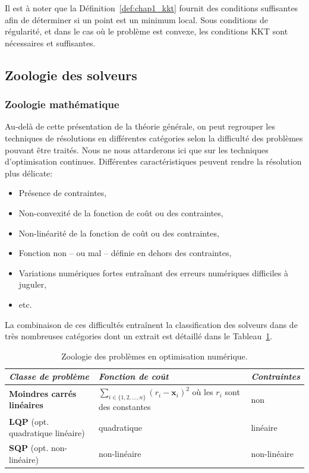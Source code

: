 Il est à noter que la Définition~\ref{def:chap1_kkt} fournit des
conditions suffisantes afin de déterminer si un point est un minimum
local. Sous conditions de régularité, et dans le cas où le problème
est convexe, les conditions KKT sont nécessaires et suffisantes.


\subsection{Zoologie des solveurs}

\subsubsection{Zoologie mathématique}


Au-delà de cette présentation de la théorie générale, on peut
regrouper les techniques de résolutions en différentes catégories
selon la difficulté des problèmes pouvant être traités. Nous ne nous
attarderons ici que sur les techniques d'optimisation
continues. Différentes caractéristiques peuvent rendre la résolution
plus délicate:
%
\begin{itemize}
\item Présence de contraintes,
\item Non-convexité de la fonction de coût ou des contraintes,
\item Non-linéarité de la fonction de coût ou des contraintes,
\item Fonction non -- ou mal -- définie en dehors des contraintes,
\item Variations numériques fortes entraînant des erreurs numériques
  difficiles à juguler,
\item etc.
\end{itemize}
%
La combinaison de ces difficultés entraînent la classification des
solveurs dans de très nombreuses catégories dont un extrait est
détaillé dans le Tableau~\ref{tbl:chap1_solver}.
%
\begin{table}\label{tbl:chap1_solver}
\begin{center}
\begin{tabular}{|>{\small}p{}|>{\small}p{}|>{\small}p{}|}
\hline
\textit{Classe de problème} & \textit{Fonction de coût} & \textit{Contraintes}\\
\hline
\textbf{Moindres carrés linéaires} & $\sum_{i \in \{1, 2, \dotsc, n\}} (r_i - \mathbf{x}_i)^2$ où les $r_i$ sont des constantes & non \\
\hline
\textbf{LQP} \small{(opt. quadratique linéaire)} & quadratique & linéaire \\
\hline
\textbf{SQP} \small{(opt. non-linéaire)} & non-linéaire & non-linéaire \\
\hline
\end{tabular}
\end{center}
\caption{Zoologie des problèmes en optimisation numérique.}
\end{table}
